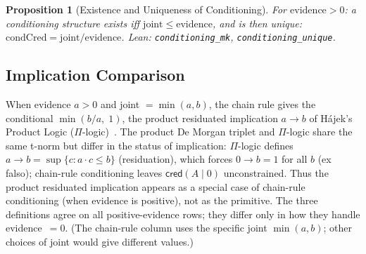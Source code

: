 \documentclass[11pt,a4paper]{article}
\newtheorem{proposition}[theorem]{Proposition}
\newcommand{\cred}{\mathsf{cred}}
\begin{document}
\begin{proposition}[Existence and Uniqueness of Conditioning]
\label{thm:existence}
\label{thm:uniqueness}
For $\mathrm{evidence} > 0$: a conditioning structure exists iff
$\mathrm{joint} \leq \mathrm{evidence}$, and is then unique:
$\mathrm{condCred} = \mathrm{joint} / \mathrm{evidence}$.
Lean: \texttt{conditioning\_mk}, \texttt{conditioning\_unique}.
\end{proposition}

\subsection{Implication Comparison}

When evidence $a > 0$ and joint $= \min(a,b)$, the chain rule gives
the conditional $\min(b/a,\; 1)$, the product residuated implication
$a \to b$ of H\'ajek's Product Logic ($\Pi$-logic)~\cite{hajek1998}.
The product De Morgan triplet and $\Pi$-logic share the same t-norm
but differ in the status of implication:
$\Pi$-logic defines $a \to b = \sup\{c : a \cdot c \leq b\}$
(residuation), which forces $0 \to b = 1$ for all $b$ (ex falso);
chain-rule conditioning leaves $\cred(A \mid 0)$ unconstrained.
Thus the product residuated implication appears as a special case of
chain-rule conditioning (when evidence is positive), not as the
primitive.
The three definitions agree on all positive-evidence rows; they differ
only in how they handle evidence~$= 0$.
(The chain-rule column uses the specific joint $\min(a,b)$; other
choices of joint would give different values.)
\end{document}

